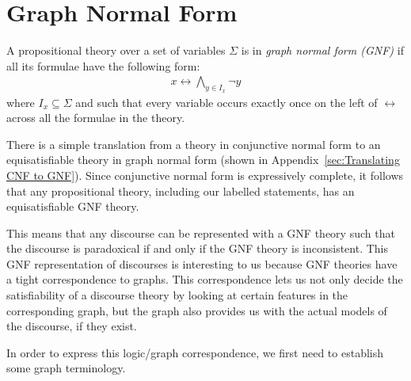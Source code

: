 
\section{Graph Normal Form}
\label{sec:Graph Normal Form}
A propositional theory over a set of variables $\Sigma$ is in \textit{graph normal form (GNF)}\cite{apal-digraph} if all its formulae have the following form:
\begin{align}
  x \leftrightarrow \bigwedge_{y \in I_x} \neg y
\end{align}
where $I_x \subseteq \Sigma$ and such that every variable occurs exactly once on the left of $\leftrightarrow$ across all the formulae in the theory.

There is a simple translation from a theory in conjunctive normal form to an equisatisfiable theory in graph normal form (shown in Appendix~\ref{sec:Translating CNF to GNF}).
Since conjunctive normal form is expressively complete, it follows that any propositional theory, including our labelled statements, has an equisatisfiable GNF theory.

This means that any discourse can be represented with a GNF theory such that the discourse is paradoxical if and only if the GNF theory is inconsistent.
This GNF representation of discourses is interesting to us because GNF theories have a tight correspondence to graphs.
This correspondence lets us not only decide the satisfiability of a discourse theory by looking at certain features in the corresponding graph, but the graph also provides us with the actual models of the discourse, if they exist.

In order to express this logic/graph correspondence, we first need to establish some graph terminology.
